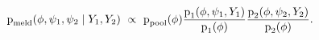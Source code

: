 \begin{equation}
  \text{p}_{\text{meld}} (\phi, \psi_{1}, \psi_{2} \mid Y_{1}, Y_{2}) \,\,\propto\,\,
  \text{p}_{\text{pool}}(\phi)
  \frac{
    \text{p}_{1}(\phi, \psi_1, Y_{1})
  } {
    \text{p}_{1}(\phi)
  }
  \frac{
    \text{p}_{2}(\phi, \psi_2, Y_{2})
  } {
    \text{p}_{2}(\phi)
  }.
  \label{eqn:melded-target-posterior}
\end{equation}